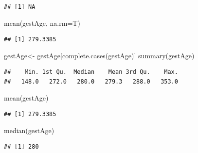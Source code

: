 \documentclass[
]{book}
\newenvironment{Shaded}{\begin{snugshade}}{\end{snugshade}}
\newcommand{\AttributeTok}[1]{\textcolor[rgb]{0.77,0.63,0.00}{#1}}
\newcommand{\FunctionTok}[1]{\textcolor[rgb]{0.00,0.00,0.00}{#1}}
\newcommand{\NormalTok}[1]{#1}
\newcommand{\OtherTok}[1]{\textcolor[rgb]{0.56,0.35,0.01}{#1}}
\newcommand{\SpecialCharTok}[1]{\textcolor[rgb]{0.00,0.00,0.00}{#1}}
\begin{document}
\begin{Shaded}
\end{Shaded}

\begin{verbatim}
## [1] NA
\end{verbatim}

\begin{Shaded}
\begin{Highlighting}[]
\FunctionTok{mean}\NormalTok{(gestAge, }\AttributeTok{na.rm=}\NormalTok{T)}
\end{Highlighting}
\end{Shaded}

\begin{verbatim}
## [1] 279.3385
\end{verbatim}

\begin{Shaded}
\begin{Highlighting}[]
\NormalTok{gestAge}\OtherTok{\textless{}{-}}\NormalTok{ gestAge[}\FunctionTok{complete.cases}\NormalTok{(gestAge)]}
\FunctionTok{summary}\NormalTok{(gestAge)}
\end{Highlighting}
\end{Shaded}

\begin{verbatim}
##    Min. 1st Qu.  Median    Mean 3rd Qu.    Max. 
##   148.0   272.0   280.0   279.3   288.0   353.0
\end{verbatim}

\begin{Shaded}
\begin{Highlighting}[]
\FunctionTok{mean}\NormalTok{(gestAge)}
\end{Highlighting}
\end{Shaded}

\begin{verbatim}
## [1] 279.3385
\end{verbatim}

\begin{Shaded}
\begin{Highlighting}[]
\FunctionTok{median}\NormalTok{(gestAge)}
\end{Highlighting}
\end{Shaded}

\begin{verbatim}
## [1] 280
\end{verbatim}
\end{document}
